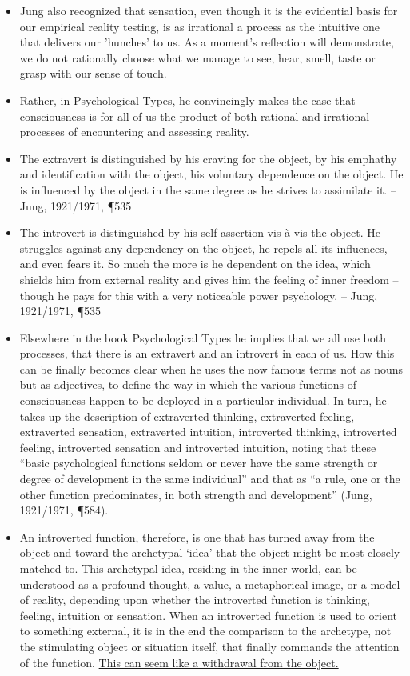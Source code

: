 \begin{itemize}
\item Jung also recognized that sensation, even though it is the evidential
basis for our empirical reality testing, is as irrational a process as the
intuitive one that delivers our 'hunches' to us. As a moment's reflection will
demonstrate, we do not rationally choose what we manage to see, hear, smell,
taste or grasp with our sense of touch.

\item Rather, in Psychological Types, he convincingly makes the case that
consciousness is for all of us the product of both rational and irrational
processes of encountering and assessing reality.

\item The extravert is distinguished by his craving for the object, by his
emphathy and identification with the object, his voluntary dependence on the
object. He is influenced by the object in the same degree as he strives to
assimilate it. -- Jung, 1921/1971, \P 535

\item The introvert is distinguished by his self-assertion vis à vis the
object.  He struggles against any dependency on the object, he repels all its
influences, and even fears it. So much the more is he dependent on the idea,
which shields him from external reality and gives him the feeling of inner
freedom -- though he pays for this with a very noticeable power psychology.
-- Jung, 1921/1971, \P 535

\item Elsewhere in the book Psychological Types he implies that we all use both
processes, that there is an extravert and an introvert in each of us.  How this
can be finally becomes clear when he uses the now famous terms not as nouns but
as adjectives, to define the way in which the various functions of
consciousness happen to be deployed in a particular individual.  In turn, he
takes up the description of extraverted thinking, extraverted feeling,
extraverted sensation, extraverted intuition, introverted thinking, introverted
feeling, introverted sensation and introverted intuition, noting that these
``basic psychological functions seldom or never have the same strength or
degree of development in the same individual'' and that as ``a rule, one or the
other function predominates, in both strength and development'' (Jung,
1921/1971, \P 584).

\item An introverted function, therefore, is one that has turned away from the
object and toward the archetypal `idea' that the object might be most closely
matched to.  This archetypal idea, residing in the inner world, can be
understood as a profound thought, a value, a metaphorical image, or a model of
reality, depending upon whether the introverted function is thinking, feeling,
intuition or sensation. When an introverted function is used to orient to
something external, it is in the end the comparison to the archetype, not the
stimulating object or situation itself, that finally commands the attention of
the function. \ul{This can seem like a withdrawal from the object.}


\end{itemize}
